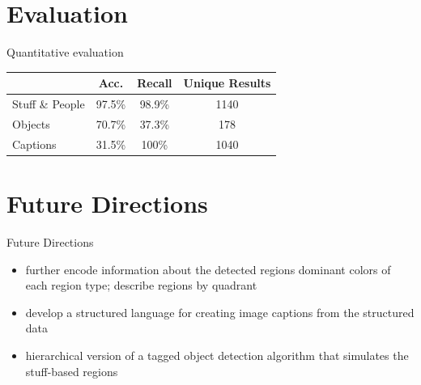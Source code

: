 \documentclass[12pt,ignorenonframetext,aspectratio=169]{beamer}
\begin{document}
\section{Evaluation}

\begin{frame}{Quantitative evaluation}
\centering

\begin{tabular}{lccc}
 \hline
 & \textbf{Acc.} & \textbf{Recall} & \textbf{Unique Results} \\
 \hline
Stuff \& People & 97.5\% & 98.9\% & 1140 \\
Objects & 70.7\% & 37.3\% & 178 \\
Captions & 31.5\% & 100\% & 1040 \\
  \hline
\end{tabular}

\end{frame}

\section{Future Directions}

\begin{frame}{Future Directions}

\begin{itemize}
\item further encode information about the detected
regions \textrightarrow{} dominant colors of each region type; describe regions by quadrant
\item develop a structured language for creating image captions from the structured
data
\item hierarchical version of a tagged object detection algorithm that simulates
the stuff-based regions
\end{itemize}

\end{frame}
\end{document}
